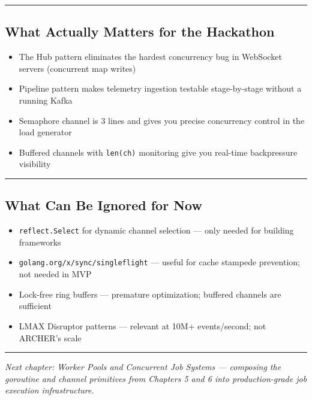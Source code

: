 \documentclass[11pt,a4paper,oneside]{book}
\providecommand{\tightlist}{\setlength{\itemsep}{0pt}\setlength{\parskip}{0pt}}
\begin{document}
\begin{center}\rule{0.5\linewidth}{0.5pt}\end{center}

\subsection{What Actually Matters for the
Hackathon}

\begin{itemize}
\tightlist
\item
  The Hub pattern eliminates the hardest concurrency bug in WebSocket
  servers (concurrent map writes)
\item
  Pipeline pattern makes telemetry ingestion testable stage-by-stage
  without a running Kafka
\item
  Semaphore channel is 3 lines and gives you precise concurrency control
  in the load generator
\item
  Buffered channels with \texttt{len(ch)} monitoring give you real-time
  backpressure visibility
\end{itemize}

\begin{center}\rule{0.5\linewidth}{0.5pt}\end{center}

\subsection{What Can Be Ignored for
Now}

\begin{itemize}
\tightlist
\item
  \texttt{reflect.Select} for dynamic channel selection --- only needed
  for building frameworks
\item
  \texttt{golang.org/x/sync/singleflight} --- useful for cache stampede
  prevention; not needed in MVP
\item
  Lock-free ring buffers --- premature optimization; buffered channels
  are sufficient
\item
  LMAX Disruptor patterns --- relevant at 10M+ events/second; not
  ARCHER's scale
\end{itemize}

\begin{center}\rule{0.5\linewidth}{0.5pt}\end{center}

\emph{Next chapter: Worker Pools and Concurrent Job Systems ---
composing the goroutine and channel primitives from Chapters 5 and 6
into production-grade job execution infrastructure.}
\end{document}
